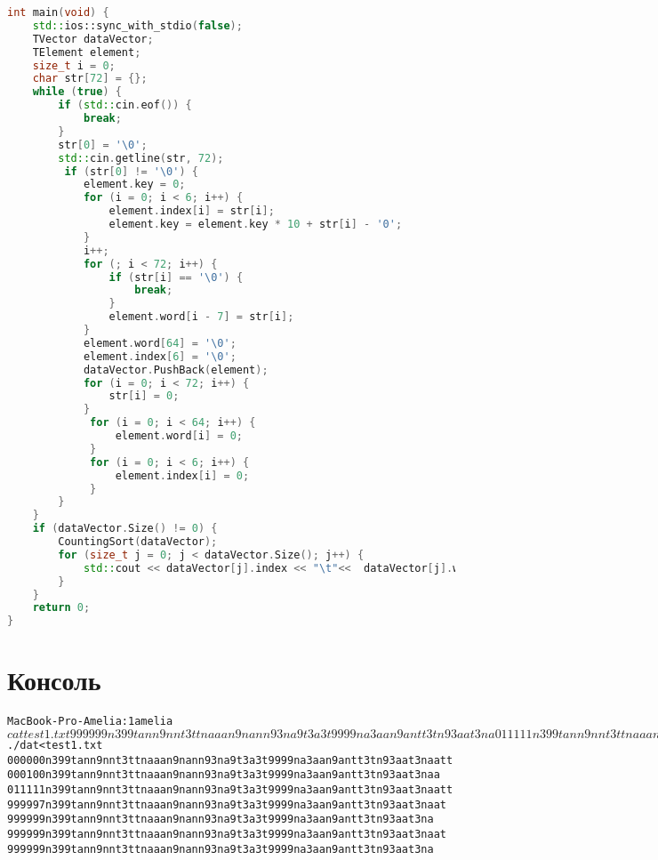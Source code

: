 \documentclass[pdf, unicode, 12pt, a4paper,oneside,fleqn]{article}
\begin{document}
\begin{lstlisting}[language=C++]
int main(void) {
    std::ios::sync_with_stdio(false);
    TVector dataVector;
    TElement element;
    size_t i = 0;
    char str[72] = {};
    while (true) {
        if (std::cin.eof()) {
            break;
        }
        str[0] = '\0';
        std::cin.getline(str, 72);
         if (str[0] != '\0') {
            element.key = 0;
            for (i = 0; i < 6; i++) {
                element.index[i] = str[i];
                element.key = element.key * 10 + str[i] - '0';
            }
            i++;
            for (; i < 72; i++) {
                if (str[i] == '\0') {
                    break;
                }
                element.word[i - 7] = str[i];
            }
            element.word[64] = '\0';
            element.index[6] = '\0';
            dataVector.PushBack(element);
            for (i = 0; i < 72; i++) {
                str[i] = 0;
            }
             for (i = 0; i < 64; i++) {
                 element.word[i] = 0;
             }
             for (i = 0; i < 6; i++) {
                 element.index[i] = 0;
             }
        }
    }
    if (dataVector.Size() != 0) {
        CountingSort(dataVector);
        for (size_t j = 0; j < dataVector.Size(); j++) {
            std::cout << dataVector[j].index << "\t"<<  dataVector[j].word << std::endl;
        }
    }
    return 0;
}
\end{lstlisting}

\section{Консоль}
\begin{alltt}
MacBook-Pro-Amelia:1 amelia$ cat test1.txt
999999	n399tann9nnt3ttnaaan9nann93na9t3a3t9999na3aan9antt3tn93aat3na


011111	n399tann9nnt3ttnaaan9nann93na9t3a3t9999na3aan9antt3tn93aat3naatt
000000	n399tann9nnt3ttnaaan9nann93na9t3a3t9999na3aan9antt3tn93aat3naatt
999997	n399tann9nnt3ttnaaan9nann93na9t3a3t9999na3aan9antt3tn93aat3naat

999999	n399tann9nnt3ttnaaan9nann93na9t3a3t9999na3aan9antt3tn93aat3naat
000100	n399tann9nnt3ttnaaan9nann93na9t3a3t9999na3aan9antt3tn93aat3naa
999999	n399tann9nnt3ttnaaan9nann93na9t3a3t9999na3aan9antt3tn93aat3na
MacBook-Pro-Amelia:1 amelia$ ./dat < test1.txt
000000	n399tann9nnt3ttnaaan9nann93na9t3a3t9999na3aan9antt3tn93aat3naatt
000100	n399tann9nnt3ttnaaan9nann93na9t3a3t9999na3aan9antt3tn93aat3naa
011111	n399tann9nnt3ttnaaan9nann93na9t3a3t9999na3aan9antt3tn93aat3naatt
999997	n399tann9nnt3ttnaaan9nann93na9t3a3t9999na3aan9antt3tn93aat3naat
999999	n399tann9nnt3ttnaaan9nann93na9t3a3t9999na3aan9antt3tn93aat3na
999999	n399tann9nnt3ttnaaan9nann93na9t3a3t9999na3aan9antt3tn93aat3naat
999999	n399tann9nnt3ttnaaan9nann93na9t3a3t9999na3aan9antt3tn93aat3na
\end{alltt}
\pagebreak
\end{document}
